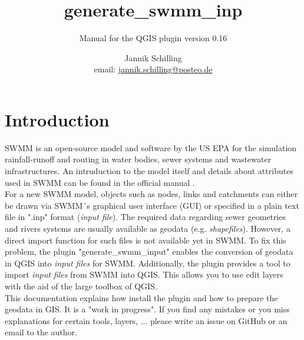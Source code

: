 \documentclass[10pt,a4paper,oneside]{scrbook}
\title{generate\_swmm\_inp}
\subtitle{Manual for the QGIS plugin version 0.16}
\author{Jannik Schilling \\ \small {email: \href{mailto:jannik.schilling@posteo.de}{jannik.schilling@posteo.de}}}
\begin{document}
\maketitle
\tableofcontents

\chapter{Introduction} \label{Introduction}
SWMM is an open-source model and software by the US EPA for the simulation rainfall-runoff and routing in water bodies, sewer systems and wastewater infrastructures. An intruduction to the model itself and details about attributes used in SWMM can be found in the official manual \cite{rossmann2015}. \\
For a new SWMM model, objects such as nodes, links and catchments can either be drawn via SWMM´s graphical user interface (GUI) or specified in a  plain text file in ".inp" format (\textit{input file}). The required data regarding sewer geometries and rivers systems are usually available as geodata (e.g. \textit{shapefiles}). However, a direct import function for such files is not available yet in SWMM. To fix this problem, the plugin "generate\_swmm\_input" enables the conversion of geodata in QGIS into \textit{input files} for SWMM. Additionally, the plugin provides a tool to import \textit{input files} from SWMM into QGIS. This allows you to use edit layers with the aid of the large toolbox of QGIS.\\
This documentation explains how install the plugin and how to prepare the geodata in GIS. It is a "work in progress". If you find any mistakes or you miss explanations for certain tools,  layers, ... please write an issue on GitHub or an email to the author.
\end{document}
